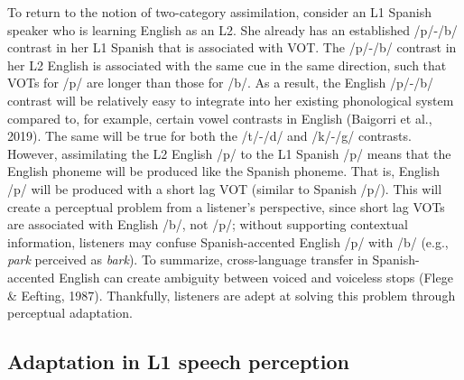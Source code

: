 \documentclass[
  12pt,
  twoside]{article}
\begin{document}
To return to the notion of two-category assimilation, consider an L1 Spanish speaker who is learning English as an L2.
She already has an established /p/-/b/ contrast in her L1 Spanish that is associated with VOT.
The /p/-/b/ contrast in her L2 English is associated with the same cue in the same direction, such that VOTs for /p/ are longer than those for /b/.
As a result, the English /p/-/b/ contrast will be relatively easy to integrate into her existing phonological system compared to, for example, certain vowel contrasts in English (Baigorri et al., 2019).
The same will be true for both the /t/-/d/ and /k/-/g/ contrasts.
However, assimilating the L2 English /p/ to the L1 Spanish /p/ means that the English phoneme will be produced like the Spanish phoneme.
That is, English /p/ will be produced with a short lag VOT (similar to Spanish /p/).
This will create a perceptual problem from a listener's perspective, since short lag VOTs are associated with English /b/, not /p/; without supporting contextual information, listeners may confuse Spanish-accented English /p/ with /b/ (e.g., \emph{park} perceived as \emph{bark}).
To summarize, cross-language transfer in Spanish-accented English can create ambiguity between voiced and voiceless stops (Flege \& Eefting, 1987).
Thankfully, listeners are adept at solving this problem through perceptual adaptation.

\hypertarget{adaptation-in-l1-speech-perception}{%
\subsection{Adaptation in L1 speech perception}\label{adaptation-in-l1-speech-perception}}
\end{document}
